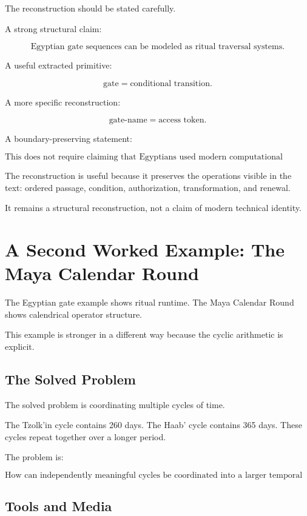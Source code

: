 \documentclass[11pt]{book}
\begin{document}
The reconstruction should be stated carefully.

A strong structural claim:

\[
\text{Egyptian gate sequences can be modeled as ritual traversal systems.}
\]

A useful extracted primitive:

\[
\text{gate} = \text{conditional transition}.
\]

A more specific reconstruction:

\[
\text{gate-name} = \text{access token}.
\]

A boundary-preserving statement:

\[
\text{This does not require claiming that Egyptians used modern computational concepts.}
\]

The reconstruction is useful because it preserves the operations visible in the text: ordered passage, condition, authorization, transformation, and renewal.

It remains a structural reconstruction, not a claim of modern technical identity.

\section{A Second Worked Example: The Maya Calendar Round}

The Egyptian gate example shows ritual runtime. The Maya Calendar Round shows calendrical operator structure.

This example is stronger in a different way because the cyclic arithmetic is explicit.

\subsection{The Solved Problem}

The solved problem is coordinating multiple cycles of time.

The Tzolk'in cycle contains 260 days. The Haab' cycle contains 365 days. These cycles repeat together over a longer period.

The problem is:

\[
\text{How can independently meaningful cycles be coordinated into a larger temporal structure?}
\]

\subsection{Tools and Media}
\end{document}
